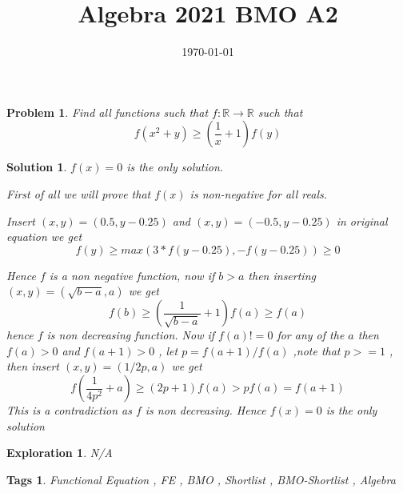 \documentclass{article}
\title{Algebra 2021 BMO A2}
\date{\today}
\newtheorem*{problem}{Problem}
\newtheorem*{solution}{Solution}
\newtheorem*{exploration}{Exploration}
\newtheorem*{tags}{Tags}
\begin{document}
	
	\maketitle
	
	\begin{problem}
		Find all functions such that \(f: \mathbb{R} \to \mathbb{R}  \) such that \\ 
		\[f(x^{2} + y) \geq \left(\frac{1}{x} + 1 \right)f(y)\]
	\end{problem}
	
	\begin{solution}
		$f(x)=0$ is the only solution.
		
		First of all we will prove that $f(x)$ is non-negative for all reals.
		
		Insert $(x,y) = (0.5,y-0.25)$ and $(x,y) = (-0.5, y-0.25) $ in original equation we get \[f(y) \geq max(3*f(y-0.25),-f(y-0.25)) \geq 0\]
		
		
		Hence $f$ is a non negative function, now if $b>a$ then inserting $(x,y)=(\sqrt{b-a},a)$ we get 
		\[f(b) \geq (\frac{1 }{\sqrt{b-a}}+1)f(a)  \geq f(a) \]
		hence $f$  is non decreasing function.
		Now if $f(a) !=0 $ for any of the $a$ then $f(a)>0$ and $f(a+1)>0$ , let $p = f(a+1)/f(a)$ ,note that $p>=1 $ , then insert $(x,y)=(1/2p,a) $ we get  
		\[f(\frac{1}{4p^2}+a) \geq (2p + 1)f(a)  > pf(a) = f(a+1) \] 
		This is a contradiction as $ f$ is non decreasing. Hence $f(x)=0$ is the only solution
	\end{solution}
	
	\begin{exploration}
		N/A
	\end{exploration}
	
	\begin{tags}
	Functional Equation , FE , BMO , Shortlist , BMO-Shortlist , Algebra
	\end{tags}
	
\end{document}
